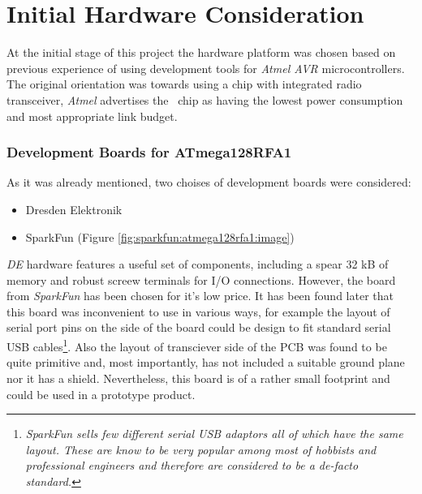 \section{Initial Hardware Consideration} \label{sec:RFA}

  At the initial stage of this project the hardware platform was chosen
 based on previous experience of using development tools for \emph{Atmel
 AVR} microcontrollers. The original orientation was towards using a chip
 with integrated radio transceiver, \emph{Atmel} advertises the \RFA\ chip
 as having the lowest power consumption and most appropriate link budget.

\subsubsection{Development Boards for ATmega128RFA1}

  As it was already mentioned, two choises of development boards were considered:

	\begin{itemize} \em
		\item Dresden Elektronik \cite{links:de:rcb,links:de:stb}
		\item SparkFun (Figure \ref{fig:sparkfun:atmega128rfa1:image})
	\end{itemize}

  \emph{DE} hardware features a useful set of components, including a spear 32 kB
 of memory and robust screew terminals for I/O connections. However, the board
 from \emph{SparkFun} has been chosen for it's low price.
  It has been found later that this board was inconvenient to use in various
 ways, for example the layout of serial port pins on the side of the board
 could be design to fit standard serial USB cables\footnote{\emph{SparkFun
 sells few different serial USB adaptors all of which have the same layout.
 These are know to be very popular among most of hobbists and professional
 engineers and therefore are considered to be a de-facto standard.}}.
 Also the layout of transciever side of the PCB was found to be quite primitive
 and, most importantly, has not included a suitable ground plane nor it has a
 shield. Nevertheless, this board is of a rather small footprint and could be
 used in a prototype product.

